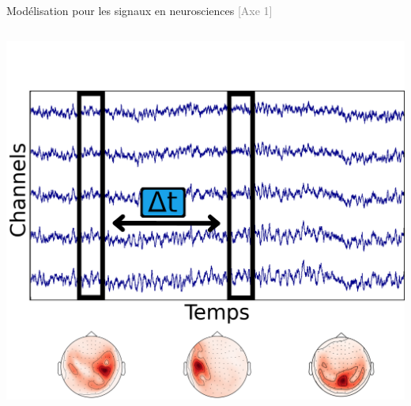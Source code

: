 \documentclass{beamer}
\def\keypoint#1{\hspace{0pt plus 1 filll}\textcolor{gray}{[{\color{linkcolor}#1}]}~}
\begin{document}
\begin{frame}[t]{Modélisation pour les signaux en neurosciences \keypoint{Axe 1}}
\begin{columns}[T]
{{            \includegraphics[width=\linewidth]{time_contrastive_delta_t}
        }\\[1em]
    }
\end{columns}

\end{frame}
\end{document}
